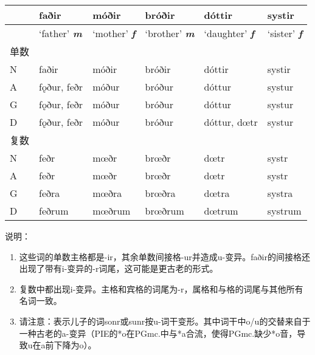 \begin{longtable}{llllll}
  \toprule
                    & \textbf{faðir}               & \textbf{móðir}             & \textbf{bróðir} & \textbf{dóttir} & \textbf{systir} \\
  \midrule
  \endhead
  \bottomrule
  \endfoot
                    & `father' \emph{\textbf{m}}   & `mother' \emph{\textbf{f}} & `brother'
  \emph{\textbf{m}} & `daughter' \emph{\textbf{f}} & `sister'
  \emph{\textbf{f}}                                                                                                                   \\
  单数              &                              &                            &                 &                 &                 \\
  N                 & faðir                        & móðir                      & bróðir          & dóttir          & systir          \\
  A                 & fǫður, feðr                  & móður                      & bróður          & dóttur          & systur          \\
  G                 & fǫður, feðr                  & móður                      & bróður          & dóttur          & systur          \\
  D                 & fǫður, feðr                  & móður                      & bróður          & dóttur, dœtr    & systur          \\
  复数              &                              &                            &                 &                 &                 \\
  N                 & feðr                         & mœðr                       & brœðr           & dœtr            & systr           \\
  A                 & feðr                         & mœðr                       & brœðr           & dœtr            & systr           \\
  G                 & feðra                        & mœðra                      & brœðra          & dœtra           & systra          \\
  D                 & feðrum                       & mœðrum                     & brœðrum         & dœtrum          & systrum         \\
\end{longtable}

说明：

\begin{enumerate}
  \item
        这些词的单数主格都是-ir，其余单数间接格-ur并造成u-变异。faðir的间接格还出现了带有i-变异的-r词尾，这可能是更古老的形式。
  \item
        复数中都出现i-变异。主格和宾格的词尾为-r，属格和与格的词尾与其他所有名词一致。
  \item
        请注意：表示儿子的词sonr或sunr按u-词干变形。其中词干中o/u的交替来自于一种古老的a-变异（PIE的*o在PGmc.中与*a合流，使得PGmc.缺少*o音，导致u在a前下降为o）。
\end{enumerate}

